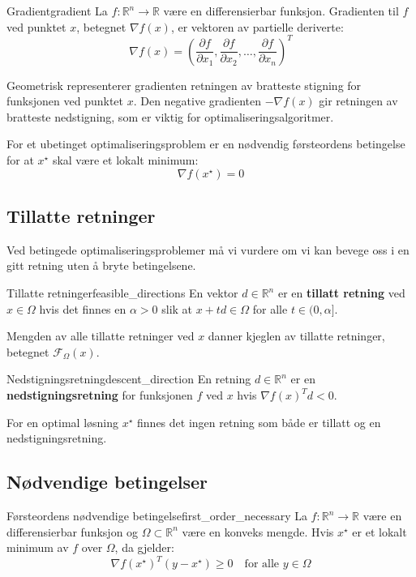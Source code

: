 \begin{definition}{Gradient}{gradient}
	La $f: \mathbb{R}^n \to \mathbb{R}$ være en differensierbar funksjon. Gradienten til $f$ ved punktet $x$, betegnet $\nabla f(x)$, er vektoren av partielle deriverte:
	\[
		\nabla f(x) = \left(\frac{\partial f}{\partial x_1}, \frac{\partial f}{\partial x_2}, \ldots, \frac{\partial f}{\partial x_n}\right)^T
	\]
\end{definition}

Geometrisk representerer gradienten retningen av bratteste stigning for funksjonen ved punktet $x$. Den negative gradienten $-\nabla f(x)$ gir retningen av bratteste nedstigning, som er viktig for optimaliseringsalgoritmer.

For et ubetinget optimaliseringsproblem er en nødvendig førsteordens betingelse for at $x^\star$ skal være et lokalt minimum:
\[
	\nabla f(x^\star) = 0
\]

\subsection{Tillatte retninger}

Ved betingede optimaliseringsproblemer må vi vurdere om vi kan bevege oss i en gitt retning uten å bryte betingelsene.

\begin{definition}{Tillatte retninger}{feasible_directions}
	En vektor $d \in \mathbb{R}^n$ er en \textbf{tillatt retning} ved $x \in \Omega$ hvis det finnes en $\alpha > 0$ slik at $x + td \in \Omega$ for alle $t \in (0, \alpha]$.

	Mengden av alle tillatte retninger ved $x$ danner kjeglen av tillatte retninger, betegnet $\mathcal{F}_\Omega(x)$.
\end{definition}

\begin{definition}{Nedstigningsretning}{descent_direction}
	En retning $d \in \mathbb{R}^n$ er en \textbf{nedstigningsretning} for funksjonen $f$ ved $x$ hvis $\nabla f(x)^T d < 0$.
\end{definition}

For en optimal løsning $x^\star$ finnes det ingen retning som både er tillatt og en nedstigningsretning.

\subsection{Nødvendige betingelser}

\begin{theorem}{Førsteordens nødvendige betingelse}{first_order_necessary}
	La $f: \mathbb{R}^n \to \mathbb{R}$ være en differensierbar funksjon og $\Omega \subset \mathbb{R}^n$ være en konveks mengde. Hvis $x^\star$ er et lokalt minimum av $f$ over $\Omega$, da gjelder:
	\[
		\nabla f(x^\star)^T (y - x^\star) \geq 0 \quad \text{for alle } y \in \Omega
	\]
\end{theorem}

